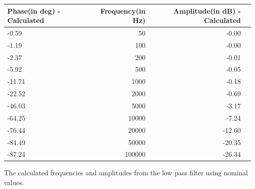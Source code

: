 \begin{adjustwidth}{-2.5 cm}{-2.5 cm}\centering\begin{threeparttable}[!htb]
        \scriptsize
        \begin{tabular}{lrrr}\toprule
            \textbf{Phase(in deg) - Calculated} & \textbf{Frequency(in Hz)} & \textbf{Amplitude(in dB) - Calculated} \\\midrule
            -0.59                               & 50                        & -0.00                                  \\
            -1.19                               & 100                       & -0.00                                  \\
            -2.37                               & 200                       & -0.01                                  \\
            -5.92                               & 500                       & -0.05                                  \\
            -11.71                              & 1000                      & -0.18                                  \\
            -22.52                              & 2000                      & -0.69                                  \\
            -46.03                              & 5000                      & -3.17                                  \\
            -64.25                              & 10000                     & -7.24                                  \\
            -76.44                              & 20000                     & -12.60                                 \\
            -84.49                              & 50000                     & -20.35                                 \\
            -87.24                              & 100000                    & -26.34                                 \\
            \bottomrule
        \end{tabular}
        \caption{The calculated frequencies and amplitudes from the low pass filter using nominal values.}
    \end{threeparttable}\end{adjustwidth}

